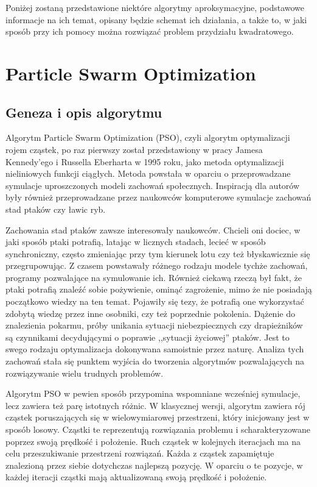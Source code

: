 Poniżej zostaną przedstawione niektóre algorytmy aproksymacyjne, podstawowe informacje na ich temat, opisany będzie schemat ich działania, a także to, w jaki sposób przy ich pomocy można rozwiązać problem przydziału kwadratowego.

\section{Particle Swarm Optimization}
\label{sec:PSO}
\subsection{Geneza i opis algorytmu} 
Algorytm Particle Swarm Optimization (PSO), czyli algorytm optymalizacji rojem cząstek, po raz pierwszy został przedstawiony w pracy Jamesa Kennedy'ego i Russella Eberharta w 1995 roku, jako metoda optymalizacji nieliniowych funkcji ciągłych. Metoda powstała w oparciu o przeprowadzane symulacje uproszczonych modeli zachowań społecznych. Inspiracją dla autorów były również  przeprowadzane przez naukowców komputerowe symulacje zachowań stad ptaków czy ławic ryb.

Zachowania stad ptaków zawsze interesowały naukowców. Chcieli oni dociec, w jaki sposób ptaki potrafią, latając w licznych stadach, lecieć w sposób synchroniczny, często zmieniając przy tym kierunek lotu czy też błyskawicznie się przegrupowując. Z czasem powstawały różnego rodzaju modele tychże zachowań, programy pozwalające na symulowanie ich. Również ciekawą rzeczą był fakt, że ptaki potrafią znaleźć sobie pożywienie, ominąć zagrożenie, mimo że nie posiadają początkowo wiedzy na ten temat. Pojawiły się tezy, że potrafią one wykorzystać zdobytą wiedzę przez inne osobniki, czy też poprzednie pokolenia. Dążenie do znalezienia pokarmu, próby unikania sytuacji niebezpiecznych czy drapieżników są czynnikami decydującymi o poprawie ,,sytuacji życiowej'' ptaków. Jest to swego rodzaju optymalizacja dokonywana samoistnie przez naturę. Analiza tych zachowań stała się punktem wyjścia do tworzenia algorytmów pozwalających na rozwiązywanie wielu trudnych problemów.

Algorytm PSO w pewien sposób przypomina wspomniane wcześniej symulacje, lecz zawiera też parę istotnych różnic. W klasycznej wersji, algorytm zawiera rój cząstek poruszających się w wielowymiarowej przestrzeni, który inicjowany jest w sposób losowy. Cząstki te reprezentują rozwiązania problemu i scharakteryzowane poprzez swoją prędkość i położenie. Ruch cząstek w kolejnych iteracjach ma na celu przeszukiwanie przestrzeni rozwiązań. Każda z cząstek zapamiętuje znalezioną przez siebie dotychczas najlepszą pozycję. W oparciu o te pozycje, w każdej iteracji cząstki mają aktualizowaną swoją prędkość i położenie.

